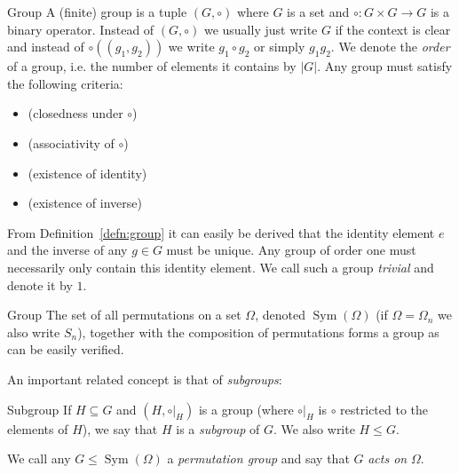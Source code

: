 \begin{defn}[label=defn:group]{Group}
  A (finite) group is a tuple $(G, \circ)$ where $G$ is a set and ${\circ: G
  \times G \rightarrow G}$ is a binary operator. Instead of $(G, \circ)$ we
  usually just write $G$ if the context is clear and instead of $\circ((g_1,
  g_2))$ we write $g_1 \circ g_2$ or simply $g_1 g_2$. We denote the
  \textit{order} of a group, i.e. the number of elements it contains by $|G|$.
  Any group must satisfy the following criteria:
  \begin{itemize}
    \item {} (closedness under $\circ$)
    \item {} (associativity of $\circ$)
    \item {} (existence of identity)
    \item {} (existence of inverse)
  \end{itemize}
\end{defn}
%
From Definition~\ref{defn:group} it can easily be derived that the identity
element $e$ and the inverse of any $g \in G$ must be unique.  Any group of
order one must necessarily only contain this identity element. We call such a
group \textit{trivial} and denote it by $1$.

\begin{exmp}{Group}
  The set of all permutations on a set $\Omega$, denoted
  $\operatorname{Sym}(\Omega)$ (if $\Omega = \Omega_n$ we also write $S_n$),
  together with the composition of permutations forms a group as can be easily
  verified.
\end{exmp}
%
An important related concept is that of \textit{subgroups}:

\begin{defn}[label=defn:subgroup]{Subgroup}
  If $H \subseteq G$ and $(H, \left.\circ\right|_H)$ is a group (where
  $\left.\circ\right|_H$ is $\circ$ restricted to the elements of $H$),
  we say that $H$ is a \textit{subgroup} of $G$. We also write $H \leq G$.
\end{defn}
%
We call any $G \leq \operatorname{Sym}(\Omega)$ a \textit{permutation group}
and say that $G$ \textit{acts on} $\Omega$.

